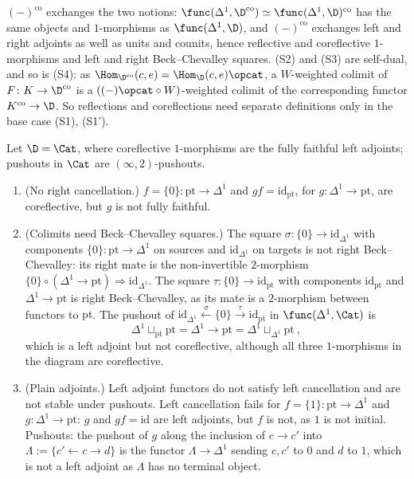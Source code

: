 $(-)^{\mathrm{co}}$ exchanges the two notions: $\func(\Delta^{1},\D^{\mathrm{co}}) \simeq \func(\Delta^{1},\D)^{\mathrm{co}}$ has the same objects and $1$-morphisms as $\func(\Delta^{1},\D)$, and $(-)^{\mathrm{co}}$ exchanges left and right adjoints as well as units and counits, hence reflective and coreflective $1$-morphisms and left and right Beck--Chevalley squares. (S2) and (S3) are self-dual, and so is (S4): as $\Hom_{\D^{\mathrm{co}}}(c,e) = \Hom_{\D}(c,e)\opcat$, a $W$-weighted colimit of $F\colon K \to \D^{\mathrm{co}}$ is a $((-)\opcat \circ W)$-weighted colimit of the corresponding functor $K^{\mathrm{co}} \to \D$.
So reflections and coreflections need separate definitions only in the base case (S1), (S1').

\begin{exmp}
\label{ex:saturation-fails}
Let $\D = \Cat$, where coreflective $1$-morphisms are the fully faithful left adjoints; pushouts in $\Cat$ are $(\infty,2)$-pushouts.
\begin{enumerate}
\item (No right cancellation.) $f = \{0\}\colon \mathrm{pt} \to \Delta^{1}$ and $gf = \mathrm{id}_{\mathrm{pt}}$, for $g\colon \Delta^{1} \to \mathrm{pt}$, are coreflective, but $g$ is not fully faithful.
\item (Colimits need Beck--Chevalley squares.) The square $\sigma\colon \{0\} \to \mathrm{id}_{\Delta^{1}}$ with components $\{0\}\colon \mathrm{pt} \to \Delta^{1}$ on sources and $\mathrm{id}_{\Delta^{1}}$ on targets is not right Beck--Chevalley: its right mate is the non-invertible $2$-morphism $\{0\} \circ (\Delta^{1} \to \mathrm{pt}) \Rightarrow \mathrm{id}_{\Delta^{1}}$. The square $\tau\colon \{0\} \to \mathrm{id}_{\mathrm{pt}}$ with components $\mathrm{id}_{\mathrm{pt}}$ and $\Delta^{1} \to \mathrm{pt}$ is right Beck--Chevalley, as its mate is a $2$-morphism between functors to $\mathrm{pt}$. The pushout of $\mathrm{id}_{\Delta^{1}} \xleftarrow{\sigma} \{0\} \xrightarrow{\tau} \mathrm{id}_{\mathrm{pt}}$ in $\func(\Delta^{1},\Cat)$ is
\[
\Delta^{1} \sqcup_{\mathrm{pt}} \mathrm{pt} = \Delta^{1} \longrightarrow \mathrm{pt} = \Delta^{1} \sqcup_{\Delta^{1}} \mathrm{pt} \ ,
\]
which is a left adjoint but not coreflective, although all three $1$-morphisms in the diagram are coreflective.
\item (Plain adjoints.) Left adjoint functors do not satisfy left cancellation and are not stable under pushouts. Left cancellation fails for $f = \{1\}\colon \mathrm{pt} \to \Delta^{1}$ and $g\colon \Delta^{1} \to \mathrm{pt}$: $g$ and $gf = \mathrm{id}$ are left adjoints, but $f$ is not, as $1$ is not initial. Pushouts: the pushout of $g$ along the inclusion of $c \to c'$ into $\Lambda := \{c' \leftarrow c \to d\}$ is the functor $\Lambda \to \Delta^{1}$ sending $c,c'$ to $0$ and $d$ to $1$, which is not a left adjoint as $\Lambda$ has no terminal object.
\end{enumerate}
\end{exmp}

